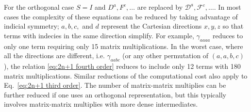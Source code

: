 \documentclass[prl,twocolumn,showpacs,twocolumngrid,superbib]{revtex4}
\def\F{\mathcal{F}}
\def\D{\mathcal{D}}
\begin{document}
For the orthogonal case $S=I$ and $D^a,F^c,\ldots$ are replaced by $\D^a,\F^c,\ldots$.
In most cases the complexity of these equations
can be reduced by taking advantage of indicial symmetry; 
$a,b,c,$ and $d$ represent the Cartesian directions $x,y,z$
so that terms with indecies in the same direction simplify. 
For example, $\gamma_{aaaa}$ reduces to only one term requiring only 15 matrix multiplications.
In the worst case, where all the directions are different, i.e. $\gamma_{aabc}$ 
(or any other permutation of $(a,a,b,c)$), the relation \eqref{eq:2n+1 fourth order} 
reduces to include only 12 terms with 180 matrix multiplications. 
Similar reductions of the computational cost also apply to 
Eq.~\eqref{eq:2n+1 third order}. The number of matrix-matrix multiplies can be further reduced
if one uses an orthogonal representation, but this typically involves matrix-matrix multiplies 
with more dense intermediates.
%
%
\end{document}
